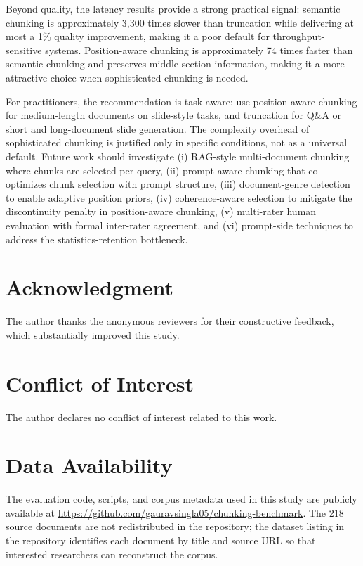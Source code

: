 \documentclass{ieeeaccess}
\begin{document}
Beyond quality, the latency results provide a strong practical signal: semantic chunking is approximately 3,300 times slower than truncation while delivering at most a 1\% quality improvement, making it a poor default for throughput-sensitive systems. Position-aware chunking is approximately 74 times faster than semantic chunking and preserves middle-section information, making it a more attractive choice when sophisticated chunking is needed.

For practitioners, the recommendation is task-aware: use position-aware chunking for medium-length documents on slide-style tasks, and truncation for Q\&A or short and long-document slide generation. The complexity overhead of sophisticated chunking is justified only in specific conditions, not as a universal default. Future work should investigate (i) RAG-style multi-document chunking where chunks are selected per query, (ii) prompt-aware chunking that co-optimizes chunk selection with prompt structure, (iii) document-genre detection to enable adaptive position priors, (iv) coherence-aware selection to mitigate the discontinuity penalty in position-aware chunking, (v) multi-rater human evaluation with formal inter-rater agreement, and (vi) prompt-side techniques to address the statistics-retention bottleneck.

\section*{Acknowledgment}
The author thanks the anonymous reviewers for their constructive feedback, which substantially improved this study.

\section*{Conflict of Interest}
The author declares no conflict of interest related to this work.

\section*{Data Availability}
The evaluation code, scripts, and corpus metadata used in this study are publicly available at \url{https://github.com/gauravsingla05/chunking-benchmark}. The 218 source documents are not redistributed in the repository; the dataset listing in the repository identifies each document by title and source URL so that interested researchers can reconstruct the corpus.
\end{document}
